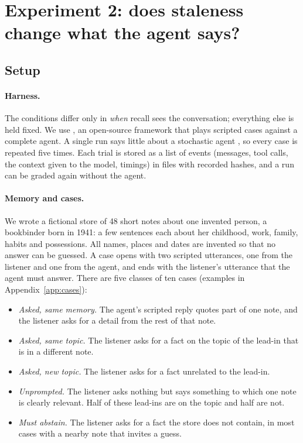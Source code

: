 \documentclass[10pt]{article}
\begin{document}
\section{Experiment 2: does staleness change what the agent says?}
\label{sec:e2}

\subsection{Setup}

\paragraph{Harness.} The conditions differ only in \emph{when} recall sees the conversation; everything else is held fixed. We use \framework{}, an open-source framework that plays scripted cases against a complete agent. A single run says little about a stochastic agent \citep{yao2024taubench}, so every case is repeated five times. Each trial is stored as a list of events (messages, tool calls, the context given to the model, timings) in files with recorded hashes, and a run can be graded again without the agent.

\paragraph{Memory and cases.} We wrote a fictional store of 48 short notes about one invented person, a bookbinder born in 1941: a few sentences each about her childhood, work, family, habits and possessions. All names, places and dates are invented so that no answer can be guessed. A case opens with two scripted utterances, one from the listener and one from the agent, and ends with the listener's utterance that the agent must answer. There are five classes of ten cases (examples in Appendix~\ref{app:cases}):

\begin{itemize}[leftmargin=*,itemsep=1pt,topsep=3pt]
\item \emph{Asked, same memory.} The agent's scripted reply quotes part of one note, and the listener asks for a detail from the rest of that note.
\item \emph{Asked, same topic.} The listener asks for a fact on the topic of the lead-in that is in a different note.
\item \emph{Asked, new topic.} The listener asks for a fact unrelated to the lead-in.
\item \emph{Unprompted.} The listener asks nothing but says something to which one note is clearly relevant. Half of these lead-ins are on the topic and half are not.
\item \emph{Must abstain.} The listener asks for a fact the store does not contain, in most cases with a nearby note that invites a guess.
\end{itemize}
\end{document}
